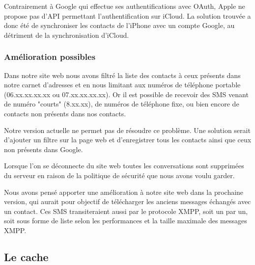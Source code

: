Contrairement à Google qui effectue ses authentifications avec OAuth, Apple ne propose pas d'API permettant l'authentification sur iCloud.
La solution trouvée a donc été de synchroniser les contacts de l'iPhone avec un compte Google, au détriment de la synchronisation d'iCloud.


\subsubsection{Amélioration possibles}


Dans notre site web nous avons filtré la liste des contacts à ceux présents dans notre carnet d'adresses et en nous limitant aux numéros de téléphone portable (06.xx.xx.xx.xx ou 07.xx.xx.xx.xx).
Or il est possible de recevoir des SMS venant de numéro "courts" (8.xx.xx), de numéros de téléphone fixe, ou bien encore de contacts non présents dans nos contacts.

Notre version actuelle ne permet pas de résoudre ce problème.
Une solution serait d'ajouter un filtre sur la page web et d'enregistrer tous les contacts ainsi que ceux non présents dans Google.



Lorsque l'on se déconnecte du site web toutes les conversations sont supprimées du serveur en raison de la politique de sécurité que nous avons voulu garder.

Nous avons pensé apporter une amélioration à notre site web dans la prochaine version, qui aurait pour objectif de télécharger les anciens messages échangés avec un contact.
Ces SMS transiteraient aussi par le protocole XMPP, soit un par un, soit sous forme de liste selon les performances et la taille maximale des messages XMPP.




\subsection{Le cache}

